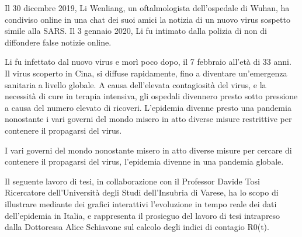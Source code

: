 
\noindent Il 30 dicembre 2019, Li Wenliang, un oftalmologista dell’ospedale di Wuhan, ha condiviso online in una chat dei suoi amici la notizia di un nuovo virus sospetto simile alla SARS.
Il 3 gennaio 2020, Li fu intimato dalla polizia di non di diffondere false notizie online.

\noindent Li fu infettato dal nuovo virus e morì poco dopo, il 7 febbraio all’età di 33 anni.
Il virus scoperto in Cina, si diffuse rapidamente, fino a diventare un'emergenza sanitaria a livello globale.
A causa dell’elevata contagiosità del virus, e la necessità di cure in terapia intensiva, gli ospedali divennero presto sotto pressione a causa del numero elevato di ricoveri.
L'epidemia divenne presto una pandemia nonostante i vari governi del mondo misero in atto diverse misure restrittive per contenere il propagarsi del virus.

\noindent I vari governi del mondo nonostante misero in atto diverse misure per cercare di contenere il propagarsi del virus, l'epidemia divenne in una pandemia globale.

\noindent Il seguente lavoro di tesi, in collaborazione con il Professor Davide Tosi Ricercatore dell’Università degli Studi dell’Insubria di Varese, ha lo scopo di illustrare mediante dei grafici interattivi l’evoluzione in tempo reale dei dati dell’epidemia in Italia, e rappresenta il prosieguo del lavoro di tesi intrapreso dalla Dottoressa Alice Schiavone sul calcolo degli indici di contagio R0(t). %